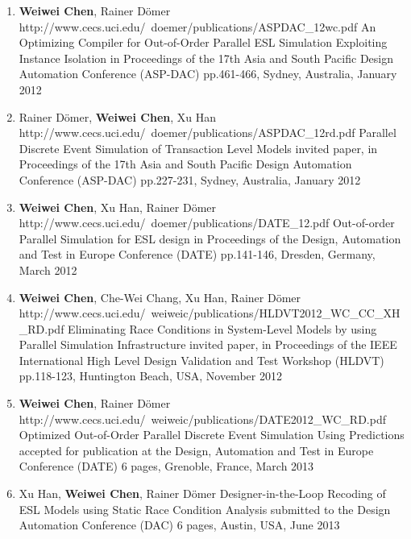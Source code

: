 \begin{enumerate}
\item
	\mypubhl
	{\textbf{Weiwei Chen}, Rainer D\"{o}mer}
	{http://www.cecs.uci.edu/~doemer/publications/ASPDAC_12wc.pdf}
	{An Optimizing Compiler for Out-of-Order Parallel ESL Simulation Exploiting Instance Isolation}
	{in Proceedings of }
	{the 17th Asia and South Pacific Design Automation Conference (ASP-DAC)}
	{pp.461-466, Sydney, Australia, January 2012}
	
	
\item
	\mypubhl
	{Rainer D\"{o}mer, \textbf{Weiwei Chen}, Xu Han}
	{http://www.cecs.uci.edu/~doemer/publications/ASPDAC_12rd.pdf}
	{Parallel Discrete Event Simulation of Transaction Level Models}
	{invited paper, in Proceedings of }
	{the 17th Asia and South Pacific Design Automation Conference (ASP-DAC)}
	{pp.227-231, Sydney, Australia, January 2012}
	
	
\item
	\mypubhl
	{\textbf{Weiwei Chen}, Xu Han, Rainer D\"{o}mer}
	{http://www.cecs.uci.edu/~doemer/publications/DATE_12.pdf}
	{Out-of-order Parallel Simulation for ESL design}
	{in Proceedings of }
	{the Design, Automation and Test in Europe Conference (DATE)}
	{pp.141-146, Dresden, Germany, March 2012}
	
\item
	\mypubhl
	{\textbf{Weiwei Chen}, Che-Wei Chang, Xu Han, Rainer D\"{o}mer}
	{http://www.cecs.uci.edu/~weiweic/publications/HLDVT2012_WC_CC_XH_RD.pdf}
	{Eliminating Race Conditions in System-Level Models by using Parallel Simulation Infrastructure} 
	{invited paper, in Proceedings of }
	{the IEEE International High Level Design Validation and Test Workshop (HLDVT)}
	{pp.118-123, Huntington Beach, USA, November 2012}
	
	
\item
	\mypubhl
	{\textbf{Weiwei Chen}, Rainer D\"{o}mer} 
	{http://www.cecs.uci.edu/~weiweic/publications/DATE2012_WC_RD.pdf}
	{Optimized Out-of-Order Parallel Discrete Event Simulation Using Predictions}
	{accepted for publication at }
	{the Design, Automation and Test in Europe Conference  (DATE)}
	{6 pages, Grenoble, France, March 2013}
	
	
\item
	\mypub
	{Xu Han, \textbf{Weiwei Chen}, Rainer D\"{o}mer}
	{Designer-in-the-Loop Recoding of ESL Models using Static Race Condition Analysis}
	{submitted to }
	{the Design Automation Conference (DAC)}
	{6 pages, Austin, USA, June 2013}
\end{enumerate}



